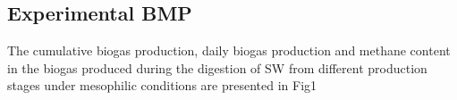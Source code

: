 \subsection{Experimental BMP}
The cumulative biogas production, daily biogas production and methane content in the biogas produced during the digestion of SW from different production stages under mesophilic conditions are presented in Fig1